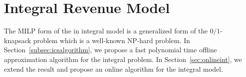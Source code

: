 \section{Integral Revenue Model}
		\label{sec:integral}
%
		The MILP form of the \MCSP in integral model is a generalized form of the $0/1$-knapsack problem which is a well-known NP-hard problem. 	
		In Section~\ref{subsec:icsalgorithm}, we propose a fast polynomial time offline approximation algorithm for the integral problem. In Section~\ref{sec:onlineint}, we extend the result and propose an online algorithm for the integral model.
		
		
